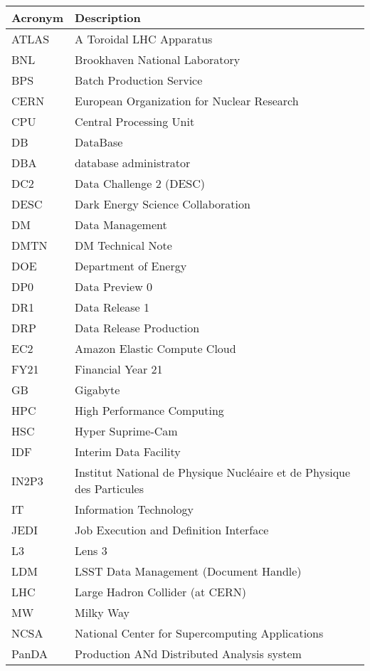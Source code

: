 \addtocounter{table}{-1}
\begin{longtable}{p{}p{}}\hline
\textbf{Acronym} & \textbf{Description}  \\\hline

ATLAS & A Toroidal LHC Apparatus \\\hline
BNL & Brookhaven National Laboratory \\\hline
BPS & Batch Production Service \\\hline
CERN & European Organization for Nuclear Research \\\hline
CPU & Central Processing Unit \\\hline
DB & DataBase \\\hline
DBA & database administrator \\\hline
DC2 & Data Challenge 2 (DESC) \\\hline
DESC & Dark Energy Science Collaboration \\\hline
DM & Data Management \\\hline
DMTN & DM Technical Note \\\hline
DOE & Department of Energy \\\hline
DP0 & Data Preview 0 \\\hline
DR1 & Data Release 1 \\\hline
DRP & Data Release Production \\\hline
EC2 & Amazon Elastic Compute Cloud \\\hline
FY21 & Financial Year 21 \\\hline
GB & Gigabyte \\\hline
HPC & High Performance Computing \\\hline
HSC & Hyper Suprime-Cam \\\hline
IDF & Interim Data Facility \\\hline
IN2P3 & Institut National de Physique Nucléaire et de Physique des Particules \\\hline
IT & Information Technology \\\hline
JEDI & Job Execution and Definition Interface \\\hline
L3 & Lens 3 \\\hline
LDM & LSST Data Management (Document Handle) \\\hline
LHC & Large Hadron Collider (at CERN) \\\hline
MW & Milky Way \\\hline
NCSA & National Center for Supercomputing Applications \\\hline
PanDA &  Production ANd Distributed Analysis system \\\hline

\end{longtable}
